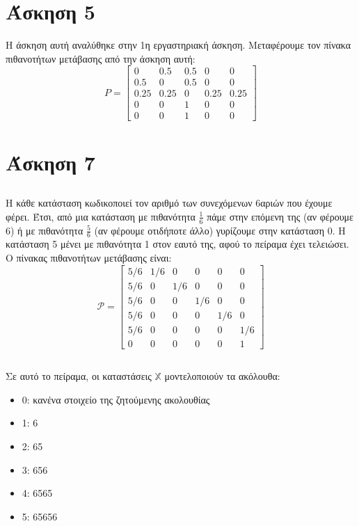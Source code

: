 \documentclass[a4paper,oneside, 11pt]{article}
\begin{document}
\section*{Άσκηση 5}
Η άσκηση αυτή αναλύθηκε στην 1η εργαστηριακή άσκηση. Μεταφέρουμε τον πίνακα πιθανοτήτων μετάβασης από την άσκηση αυτή:
$$P = \begin{bmatrix}0 & 0.5 & 0.5 & 0 & 0  \\ 0.5 & 0 & 0.5 & 0 & 0 \\ 0.25 & 0.25 & 0 & 0.25 & 0.25 \\ 0 & 0 & 1 & 0 & 0\\ 0 & 0 & 1 & 0 & 0\end{bmatrix}$$


\section*{Άσκηση 7}
\subsection{}
Η κάθε κατάσταση κωδικοποιεί τον αριθμό των συνεχόμενων 6αριών που έχουμε φέρει. Έτσι, από μια κατάσταση με πιθανότητα $\frac{1}{6}$ πάμε στην επόμενη της (αν φέρουμε 6) ή με πιθανότητα $\frac{5}{6}$ (αν φέρουμε οτιδήποτε άλλο) γυρίζουμε στην κατάσταση 0. Η κατάσταση 5 μένει με πιθανότητα 1 στον εαυτό της, αφού το πείραμα έχει τελειώσει. Ο πίνακας πιθανοτήτων μετάβασης είναι:
$$
\mathcal{P} = \begin{bmatrix}
5/6 & 1/6 & 0 & 0 & 0 & 0\\
5/6 & 0 & 1/6 & 0 & 0 & 0 \\
5/6 & 0 & 0 & 1/6 & 0 & 0 \\
5/6 & 0 & 0 & 0 & 1/6 & 0 \\
5/6 & 0 & 0 & 0 & 0 & 1/6 \\
0 & 0 & 0 & 0 & 0 & 1
\end{bmatrix}
$$

\subsection{}
Σε αυτό το πείραμα, οι καταστάσεις $\mathbb X$ μοντελοποιούν τα ακόλουθα:
\begin{itemize}
	\item 0: κανένα στοιχείο της ζητούμενης ακολουθίας
	\item 1: 6
	\item 2: 65
	\item 3: 656
	\item 4: 6565
	\item 5: 65656
\end{itemize}
\end{document}
